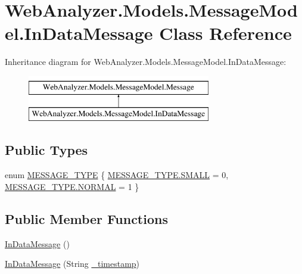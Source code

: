 \hypertarget{class_web_analyzer_1_1_models_1_1_message_model_1_1_in_data_message}{}\section{Web\+Analyzer.\+Models.\+Message\+Model.\+In\+Data\+Message Class Reference}
\label{class_web_analyzer_1_1_models_1_1_message_model_1_1_in_data_message}
Inheritance diagram for Web\+Analyzer.\+Models.\+Message\+Model.\+In\+Data\+Message\+:\begin{figure}[H]
\begin{center}
\leavevmode
\includegraphics[height=2.000000cm]{class_web_analyzer_1_1_models_1_1_message_model_1_1_in_data_message}
\end{center}
\end{figure}
\subsection*{Public Types}
\begin{DoxyCompactItemize}
\item 
enum \hyperlink{class_web_analyzer_1_1_models_1_1_message_model_1_1_in_data_message_a5c01620a5429c5eec75477e614c96f94}{M\+E\+S\+S\+A\+G\+E\+\_\+\+T\+Y\+P\+E} \{ \hyperlink{class_web_analyzer_1_1_models_1_1_message_model_1_1_in_data_message_a5c01620a5429c5eec75477e614c96f94a9b9c17e13f0e3dc9860a26e08b59b2a7}{M\+E\+S\+S\+A\+G\+E\+\_\+\+T\+Y\+P\+E.\+S\+M\+A\+L\+L} = 0, 
\hyperlink{class_web_analyzer_1_1_models_1_1_message_model_1_1_in_data_message_a5c01620a5429c5eec75477e614c96f94a1e23852820b9154316c7c06e2b7ba051}{M\+E\+S\+S\+A\+G\+E\+\_\+\+T\+Y\+P\+E.\+N\+O\+R\+M\+A\+L} = 1
 \}
\end{DoxyCompactItemize}
\subsection*{Public Member Functions}
\begin{DoxyCompactItemize}
\item 
\hyperlink{class_web_analyzer_1_1_models_1_1_message_model_1_1_in_data_message_aeb6ca5c7fb12aee16cfc47a0bef803b4}{In\+Data\+Message} ()
\item 
\hyperlink{class_web_analyzer_1_1_models_1_1_message_model_1_1_in_data_message_a7fcbbb880450beda0bbe836ed3a95084}{In\+Data\+Message} (String \hyperlink{class_web_analyzer_1_1_models_1_1_message_model_1_1_message_ae1e243f35e213e08ec2bdc54f64b0d2e}{\+\_\+timestamp})
\end{DoxyCompactItemize}
